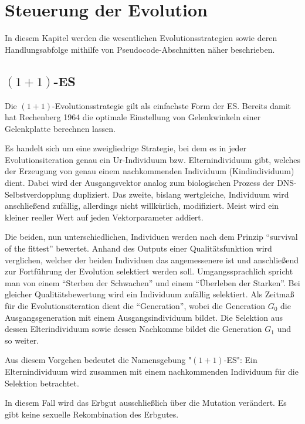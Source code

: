 
\section{Steuerung der Evolution}

In diesem Kapitel werden die wesentlichen Evolutionsstrategien sowie deren Handlungsabfolge mithilfe von Pseudocode-Abschnitten näher beschrieben.

\subsection{$(1+1)$-ES}

Die $(1+1)$-Evolutionsstrategie gilt als einfachste Form der ES. Bereits damit hat Rechenberg 1964 die optimale Einstellung von Gelenkwinkeln einer Gelenkplatte berechnen lassen.

Es handelt sich um eine zweigliedrige Strategie, bei dem es in jeder Evolutionsiteration genau ein Ur-Individuum bzw. Elternindividuum gibt, welches der Erzeugung von genau einem nachkommenden Individuum (Kindindividuum) dient. Dabei wird der Ausgangsvektor analog zum biologischen Prozess der DNS-Selbstverdopplung dupliziert. Das zweite, bislang wertgleiche, Individuum wird anschließend zufällig, allerdings nicht willkürlich, modifiziert. Meist wird ein kleiner reeller Wert auf jeden Vektorparameter addiert.

Die beiden, nun unterschiedlichen, Individuen werden nach dem Prinzip \enquote{survival of the fittest} bewertet.
Anhand des Outputs einer Qualitätsfunktion wird verglichen, welcher der beiden Individuen das angemessenere ist und anschließend zur Fortführung der Evolution selektiert werden soll.
Umgangssprachlich spricht man von einem \enquote{Sterben der Schwachen} und einem \enquote{Überleben der Starken}.
Bei gleicher Qualitätsbewertung wird ein Individuum zufällig selektiert.
Als Zeitmaß für die Evolutionsiteration dient die \enquote{Generation}, wobei die Generation $G_0$ die Ausgangsgeneration mit einem Ausgangsindividuum bildet. Die Selektion aus dessen Elterindividuum sowie dessen Nachkomme bildet die Generation $G_1$ und so weiter.

Aus diesem Vorgehen bedeutet die Namensgebung "$(1+1)$-ES": Ein Elternindividuum wird zusammen mit einem nachkommenden Individuum für die Selektion betrachtet.

In diesem Fall wird das Erbgut ausschließlich über die Mutation verändert. Es gibt keine sexuelle Rekombination des Erbgutes.

